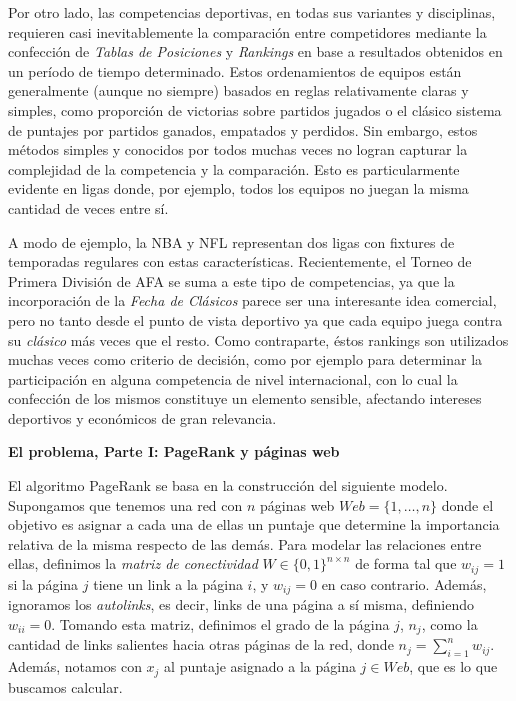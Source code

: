 Por otro lado, las competencias deportivas, en todas sus variantes y disciplinas, requieren casi inevitablemente la comparaci\'on entre competidores
mediante la confecci\'on de \emph{Tablas de Posiciones} y \emph{Rankings} en base a resultados obtenidos en un per\'iodo de tiempo determinado. 
Estos ordenamientos de equipos est\'an generalmente (aunque no siempre) basados en reglas relativamente claras y simples, como proporci\'on 
de victorias sobre partidos jugados o el cl\'asico sistema de puntajes por partidos ganados, empatados y perdidos. Sin embargo, estos m\'etodos
simples y conocidos por todos muchas veces no logran capturar la complejidad de la competencia y la comparaci\'on. Esto es particularmente
evidente en ligas donde, por ejemplo, todos los equipos no juegan la misma cantidad de veces entre s\'i.

A modo de ejemplo, la NBA y NFL representan dos ligas con fixtures de temporadas regulares con estas caracter\'isticas. Recientemente, el Torneo de 
Primera Divisi\'on de AFA se suma a este tipo de competencias, ya que la incorporaci\'on de la \emph{Fecha de Cl\'asicos} parece ser una interesante 
idea comercial, pero no tanto desde el punto de vista deportivo ya que cada equipo juega contra su \emph{cl\'asico} m\'as veces que el resto. 
Como contraparte, \'estos rankings son utilizados muchas veces como criterio de decisi\'on, como por ejemplo para determinar la participaci\'on en 
alguna competencia de nivel internacional, con lo cual la confecci\'on de los mismos constituye un elemento sensible, afectando intereses deportivos 
y econ\'omicos de gran relevancia.


\vskip 5pt
\noindent\textbf{El problema, Parte I: PageRank y p\'aginas web}
\vskip 5pt

El algoritmo PageRank se basa en la construcci\'on del siguiente modelo. Supongamos que tenemos una red con $n$ p\'aginas 
web $Web = \{1,\dots,n\}$ donde
el objetivo es asignar a cada una de ellas un puntaje que determine la importancia relativa de la misma respecto de las
dem\'as. Para modelar las relaciones entre ellas, definimos la \emph{matriz de conectividad} $W \in \{0,1\}^{n \times n}$ 
de forma tal que $w_{ij} = 1$ si la p\'agina $j$ tiene un link a la p\'agina $i$, y $w_{ij} = 0$ en caso contrario. 
Adem\'as, ignoramos los \emph{autolinks}, es decir, links de una p\'agina a s\'i misma, definiendo $w_{ii} = 0$. Tomando 
esta matriz, definimos el grado de la p\'agina $j$, $n_j$, como la cantidad de links salientes hacia otras p\'aginas 
de la red, donde $n_j = \sum_{i = 1}^n w_{ij}$. Adem\'as, notamos con $x_j$ al puntaje asignado a la p\'agina $j\in
Web$, que es lo que buscamos calcular.

